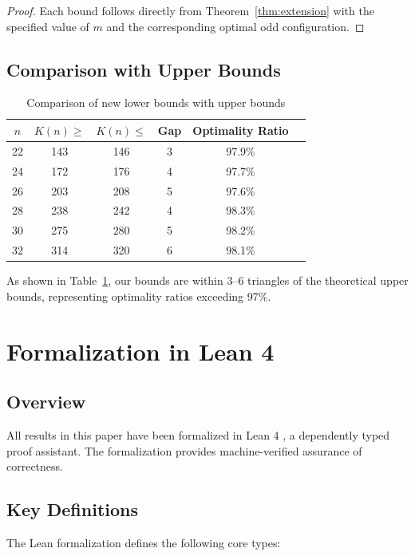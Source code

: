 \documentclass[11pt,a4paper]{article}
\theoremstyle{plain}
\theoremstyle{definition}
\theoremstyle{remark}
\newcommand{\K}{K}
\begin{document}
\begin{proof}
Each bound follows directly from Theorem~\ref{thm:extension} with the specified value of $m$ and the corresponding optimal odd configuration.
\end{proof}

\subsection{Comparison with Upper Bounds}

\begin{table}[htbp]
\centering
\caption{Comparison of new lower bounds with upper bounds}
\label{tab:comparison}
\begin{tabular}{@{}cccccc@{}}
\toprule
$n$ & $\K(n) \geq$ & $\K(n) \leq$ & Gap & Optimality Ratio \\
\midrule
22 & 143 & 146 & 3 & 97.9\% \\
24 & 172 & 176 & 4 & 97.7\% \\
26 & 203 & 208 & 5 & 97.6\% \\
28 & 238 & 242 & 4 & 98.3\% \\
30 & 275 & 280 & 5 & 98.2\% \\
32 & 314 & 320 & 6 & 98.1\% \\
\bottomrule
\end{tabular}
\end{table}

As shown in Table~\ref{tab:comparison}, our bounds are within 3--6 triangles of the theoretical upper bounds, representing optimality ratios exceeding 97\%.

\section{Formalization in Lean 4}

\subsection{Overview}

All results in this paper have been formalized in Lean 4 \cite{moura2021lean}, a dependently typed proof assistant. The formalization provides machine-verified assurance of correctness.

\subsection{Key Definitions}

The Lean formalization defines the following core types:
\end{document}
